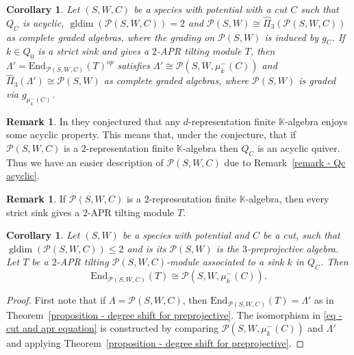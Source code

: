 \documentclass[a4paper, reqno]{amsart}
\newtheorem{mycor}[mythm]{Corollary}
\theoremstyle{definition}
\newtheorem{myrem}[mythm]{Remark}
\newcommand{\K}{\mathbb{K}}
\DeclareMathOperator{\gldim}{\mathrm{gldim}}
\begin{document}
\iffalse
\begin{mycor}
	Let $(S, W, C)$ be a species with potential with a cut $C$ such that $Q_C$ is acyclic, $\gldim(\mathcal{P}(S, W, C)) = 2$ and $\mathcal{P}(S, W)\cong \widehat{\Pi}_3(\mathcal{P}(S, W, C))$ as complete graded algebras, where the grading on $\mathcal{P}(S, W)$ is induced by $g_C$. If $k\in Q_0$ is a strict sink and gives a $2$-APR tilting module $T$, then $\Lambda' = \mathrm{End}_{\mathcal{P}(S, W, C)}(T)^{op}$ satisfies $\Lambda' \cong \mathcal{P}(S, W, \mu_k^-(C))$ and $\widehat{\Pi}_3(\Lambda')\cong \mathcal{P}(S, W)$ as complete graded algebras, where $\mathcal{P}(S, W)$ is graded via $g_{\mu_k^-(C)}$.
\end{mycor}

\begin{myrem}
	In \cite{HI14nrepinfinitealg} they conjectured that any $d$-representation finite $\K$-algebra enjoys some acyclic property. This means that, under the conjecture, that if $\mathcal{P}(S, W, C)$ is a $2$-representation finite $\K$-algebra then $Q_C$ is an acyclic quiver. Thus we have an easier description of $\mathcal{P}(S, W, C)$ due to Remark~\ref{remark - Qc acyclic}.
\end{myrem}

\begin{myrem}
	If $\mathcal{P}(S, W, C)$ is a $2$-representation finite $\K$-algebra, then every strict sink gives a $2$-APR tilting module $T$.
\end{myrem}

\begin{mycor}\label{corollary - cut mutation and 2-apr tilts}
	Let $(S, W)$ be a species with potential and $C$ be a cut, such that $\gldim(\mathcal{P}(S, W, C)) \le 2$ and is its $\mathcal{P}(S, W)$ is the $3$-preprojective algebra. Let $T$ be a $2$-APR tilting $\mathcal{P}(S, W, C)$-module associated to a sink $k$ in $Q_C$. Then
	\begin{equation}\label{eq - cut and apr equation}
		\mathrm{End}_{\mathcal{P}(S, W, C)}(T) \cong \mathcal{P}(S, W, \mu_k^-(C)).
	\end{equation}
\end{mycor}

\begin{proof}
	First note that if $\Lambda = \mathcal{P}(S, W, C)$, then $\mathrm{End}_{\mathcal{P}(S, W, C)}(T) = \Lambda'$ as in Theorem~\ref{proposition - degree shift for preprojective}. The isomorphism in \eqref{eq - cut and apr equation} is constructed by comparing $\mathcal{P}(S, W, \mu_k^-(C))$ and $\Lambda'$ and applying Theorem~\ref{proposition - degree shift for preprojective}.
\end{proof}
\end{document}
